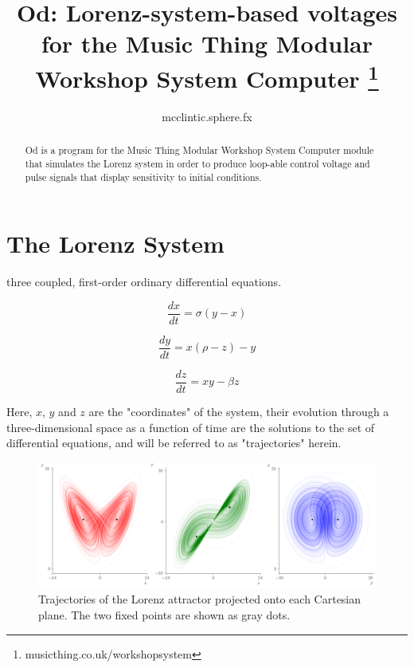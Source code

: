 \documentclass{tufte-handout}
\title{Od: Lorenz-system-based voltages for the Music Thing Modular Workshop System Computer
\thanks{musicthing.co.uk/workshopsystem}}
\author[mcclintic.sphere.fx]{mcclintic.sphere.fx}
\begin{document}
\maketitle%

\begin{abstract}
\noindent
Od is a program for the Music Thing Modular Workshop System Computer
module that simulates the Lorenz system in order to produce loop-able 
control voltage and pulse signals that display sensitivity to initial conditions.
\end{abstract}


\section{The Lorenz System}\label{sec:the-lorenz-system}

 three coupled, first-order ordinary differential equations.

$$\frac{dx}{dt} = \sigma(y - x)$$

$$\frac{dy}{dt} = x(\rho - z) - y$$

$$\frac{dz}{dt} = x y - \beta z$$

Here, $x$, $y$ and $z$ are the "coordinates" of the system, their evolution through a three-dimensional space as a function of time are the solutions to the set of differential equations, and will be referred to as "trajectories" herein.

\begin{figure}[h]
  \includegraphics[width=\linewidth]{lorenz_attractor.png}%
  \caption{Trajectories of the Lorenz attractor projected onto each Cartesian plane. The two fixed points are shown as gray dots.}%
  \label{fig:fullfig}%
\end{figure}
\end{document}
